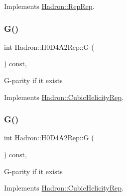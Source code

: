 Implements \mbox{\hyperlink{structHadron_1_1RepRep_a92c8802e5ed7afd7da43ccfd5b7cd92b}{Hadron\+::\+Rep\+Rep}}.

\mbox{\label{structHadron_1_1H0D4A2Rep_a637522dc6caee2869b2bb632a4c5a5b5}} 
\subsubsection{\texorpdfstring{G()}{G()}\hspace{0.1cm}{\footnotesize\ttfamily [1/3]}}
{\footnotesize\ttfamily int Hadron\+::\+H0\+D4\+A2\+Rep\+::G (\begin{DoxyParamCaption}{ }\end{DoxyParamCaption}) const\hspace{0.3cm}{\ttfamily [inline]}, {\ttfamily [virtual]}}

G-\/parity if it exists 

Implements \mbox{\hyperlink{structHadron_1_1CubicHelicityRep_a50689f42be1e6170aa8cf6ad0597018b}{Hadron\+::\+Cubic\+Helicity\+Rep}}.

\mbox{\label{structHadron_1_1H0D4A2Rep_a637522dc6caee2869b2bb632a4c5a5b5}} 
\subsubsection{\texorpdfstring{G()}{G()}\hspace{0.1cm}{\footnotesize\ttfamily [2/3]}}
{\footnotesize\ttfamily int Hadron\+::\+H0\+D4\+A2\+Rep\+::G (\begin{DoxyParamCaption}{ }\end{DoxyParamCaption}) const\hspace{0.3cm}{\ttfamily [inline]}, {\ttfamily [virtual]}}

G-\/parity if it exists 

Implements \mbox{\hyperlink{structHadron_1_1CubicHelicityRep_a50689f42be1e6170aa8cf6ad0597018b}{Hadron\+::\+Cubic\+Helicity\+Rep}}.

\mbox{\label{structHadron_1_1H0D4A2Rep_a637522dc6caee2869b2bb632a4c5a5b5}} 
